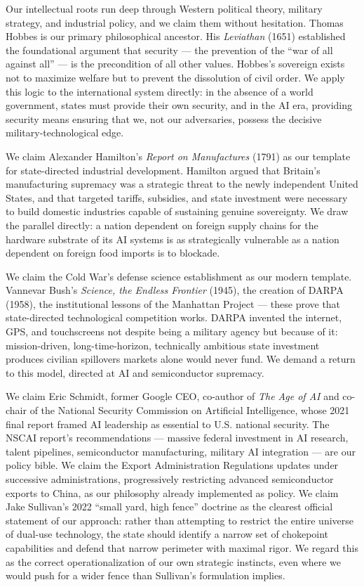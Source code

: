 Our intellectual roots run deep through Western political theory,
military strategy, and industrial policy, and we claim them without
hesitation. Thomas Hobbes is our primary philosophical ancestor. His
\emph{Leviathan} (1651) established the foundational argument that
security --- the prevention of the ``war of all against all'' --- is the
precondition of all other values. Hobbes's sovereign exists not to
maximize welfare but to prevent the dissolution of civil order. We apply
this logic to the international system directly: in the absence of a
world government, states must provide their own security, and in the AI
era, providing security means ensuring that we, not our adversaries,
possess the decisive military-technological edge.

We claim Alexander Hamilton's \emph{Report on Manufactures} (1791) as
our template for state-directed industrial development. Hamilton argued
that Britain's manufacturing supremacy was a strategic threat to the
newly independent United States, and that targeted tariffs, subsidies,
and state investment were necessary to build domestic industries capable
of sustaining genuine sovereignty. We draw the parallel directly: a
nation dependent on foreign supply chains for the hardware substrate of
its AI systems is as strategically vulnerable as a nation dependent on
foreign food imports is to blockade.

We claim the Cold War's defense science establishment as our modern
template. Vannevar Bush's \emph{Science, the Endless Frontier} (1945),
the creation of DARPA (1958), the institutional lessons of the Manhattan
Project --- these prove that state-directed technological competition
works. DARPA invented the internet, GPS, and touchscreens not despite
being a military agency but because of it: mission-driven,
long-time-horizon, technically ambitious state investment produces
civilian spillovers markets alone would never fund. We demand a return
to this model, directed at AI and semiconductor supremacy.

We claim Eric Schmidt, former Google CEO, co-author of \emph{The Age of
AI} and co-chair of the National Security Commission on Artificial
Intelligence, whose 2021 final report framed AI leadership as essential
to U.S. national security. The NSCAI report's recommendations ---
massive federal investment in AI research, talent pipelines,
semiconductor manufacturing, military AI integration --- are our policy
bible. We claim the Export Administration Regulations updates under
successive administrations, progressively restricting advanced
semiconductor exports to China, as our philosophy already implemented as
policy. We claim Jake Sullivan's 2022 ``small yard, high fence''
doctrine as the clearest official statement of our approach: rather than
attempting to restrict the entire universe of dual-use technology, the
state should identify a narrow set of chokepoint capabilities and defend
that narrow perimeter with maximal rigor. We regard this as the correct
operationalization of our own strategic instincts, even where we would
push for a wider fence than Sullivan's formulation implies.

